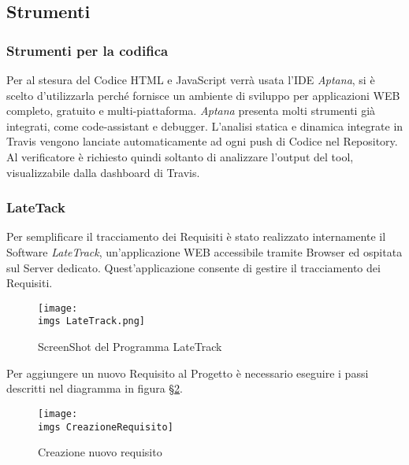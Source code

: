   \subsection{Strumenti}
  \subsubsection{Strumenti per la codifica}
  \label{sec:strumentiCodifica}
  Per al stesura del Codice HTML e JavaScript verrà usata l'IDE \emph{Aptana}, si è scelto d'utilizzarla perché fornisce un ambiente di sviluppo per applicazioni WEB completo, gratuito e multi-piattaforma.
  \emph{Aptana} presenta molti strumenti già integrati, come code-assistant e debugger. 
  L’analisi statica e dinamica integrate in Travis vengono lanciate automaticamente ad ogni push di Codice nel Repository. Al verificatore è richiesto quindi soltanto di analizzare l’output del tool, visualizzabile dalla dashboard di Travis.
  
  
  \subsubsection{LateTack}
  \label{sec:lateTrack}
  Per semplificare il tracciamento dei Requisiti è stato realizzato internamente il Software
  \emph{LateTrack}, un’applicazione WEB accessibile tramite Browser ed ospitata sul Server dedicato.
  Quest’applicazione consente di gestire il tracciamento dei Requisiti.
  
  \begin{figure}[H]
  	\centering
  \texttt{[image: \\imgs LateTrack.png]}
    \caption{ScreenShot del Programma LateTrack}
    \label{fig:lateTrack}
  \end{figure}
  Per aggiungere un nuovo Requisito al Progetto è necessario eseguire i passi descritti nel
  diagramma in figura \S\ref{fig:CreazioneRequisito}.
  \begin{figure}
  	\centering
  	\texttt{[image: \\imgs CreazioneRequisito]}
   	 \caption{Creazione nuovo requisito}
    	\label{fig:CreazioneRequisito}
  \end{figure}
  
  